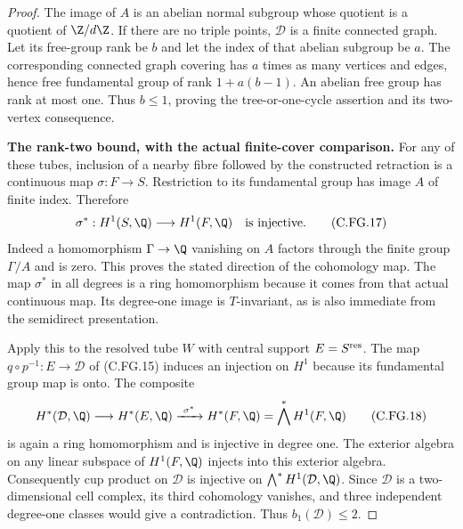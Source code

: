\begin{proof}
The image of $A$ is an abelian normal subgroup whose quotient is
a quotient of $\Z/d\Z$. If there are no triple points,
$\mathcal D$ is a finite connected graph. Let its free-group rank
be $b$ and let the index of that abelian subgroup be $a$.
The corresponding connected graph covering has $a$ times as many
vertices and edges, hence free fundamental group of rank
$1+a(b-1)$. An abelian free group has rank at most one. Thus
$b\le1$, proving the tree-or-one-cycle assertion and its two-vertex
consequence.

\par\medskip\noindent\textbf{The rank-two bound, with the actual finite-cover comparison.}
For any of these tubes, inclusion of a nearby fibre followed by
the constructed retraction is a continuous map
$\sigma:F\to S$. Restriction to its fundamental group has image
$A$ of finite index. Therefore
\[
 \sigma^*:H^1(S,\Q)\longrightarrow H^1(F,\Q)
           \quad\hbox{is injective}.                  \tag{C.FG.17}
\]
Indeed a homomorphism $\Gamma\to\Q$ vanishing on $A$ factors through
the finite group $\Gamma/A$ and is zero. This proves the stated
direction of the cohomology map. The map $\sigma^*$ in all degrees
is a ring homomorphism because it comes from that actual continuous
map. Its degree-one image is $T$-invariant, as is also immediate
from the semidirect presentation.

Apply this to the resolved tube $W$ with central support
$E=S^{\rm res}$. The map $q\circ p^{-1}:E\to\mathcal D$ of
(C.FG.15) induces an injection on $H^1$ because its fundamental
group map is onto. The composite
\[
 H^*(\mathcal D,\Q)\longrightarrow H^*(E,\Q)
               \xrightarrow{\ \sigma^*\ }H^*(F,\Q)
                  =\bigwedge^*H^1(F,\Q)               \tag{C.FG.18}
\]
is again a ring homomorphism and is injective in degree one.
The exterior algebra on any linear subspace of $H^1(F,\Q)$
injects into this exterior algebra. Consequently cup product
on $\mathcal D$ is injective on
$\bigwedge^*H^1(\mathcal D,\Q)$. Since $\mathcal D$ is a
two-dimensional cell complex, its third cohomology vanishes,
and three independent degree-one classes would give a
contradiction. Thus $b_1(\mathcal D)\le2$.


\end{proof}
